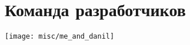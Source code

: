 \documentclass{article}
\begin{document}
\section{Команда разработчиков}

\begin{center}
    \centering
    \texttt{[image: misc/me\_and\_danil]}
\end{center}
\end{document}
